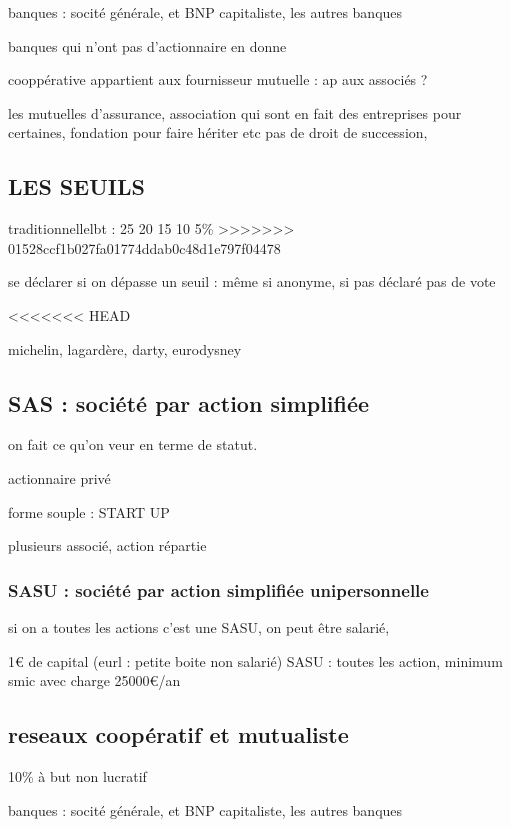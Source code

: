 \documentclass[a4paper,12pt]{article}
\begin{document}
banques : socité générale, et BNP capitaliste, les autres banques

banques qui n'ont pas d'actionnaire en donne 

cooppérative appartient aux fournisseur
mutuelle : ap aux associés ?

les mutuelles d'assurance, association qui sont en fait des entreprises pour certaines, 
fondation pour faire hériter etc pas de droit de succession, 


\subsection{LES SEUILS}
traditionnellelbt : 25 20 15 10 5\%
>>>>>>> 01528ccf1b027fa01774ddab0c48d1e797f04478

se déclarer si on dépasse un seuil : même si anonyme, si pas déclaré pas de vote

<<<<<<< HEAD

michelin, lagardère,  darty, eurodysney

\subsection{SAS : société par action simplifiée}



on fait ce qu'on veur en terme de statut.

actionnaire privé

forme souple : START UP

plusieurs associé, action répartie

 \subsubsection{SASU : société par action simplifiée unipersonnelle}

si on a toutes les actions c'est une SASU, on peut être salarié,

1€ de capital (eurl : petite boite non salarié)
SASU : toutes les action, minimum smic avec charge 25000€/an


\subsection{reseaux coopératif et mutualiste}

10\% à but non lucratif



banques : socité générale, et BNP capitaliste, les autres banques
\end{document}
